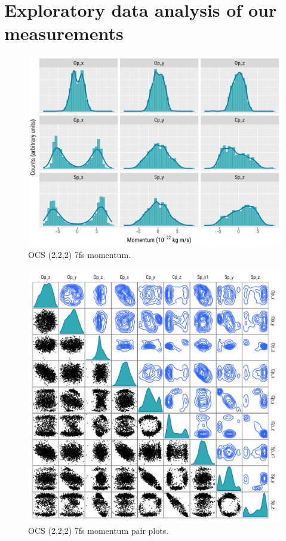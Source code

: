 
\pagebreak
\section{Exploratory data analysis of our measurements}

\begin{figure}
  \centering
  \includegraphics[width=\textwidth]{Plots/OCS2227fsMomentum}
  \caption[OCS (2,2,2) 7fs momentum.]
  {OCS (2,2,2) 7fs momentum.}
  \label{fig:OCS2227fsMomentum}
\end{figure}
\clearpage

\pagebreak
\begin{figure}
  \centering
  \includegraphics[width=\textwidth]{Plots/OCS2227fsMomentumPairPlots}
  \caption[OCS (2,2,2) 7fs momentum pair plots.]
  {OCS (2,2,2) 7fs momentum pair plots.}
  \label{fig:OCS2227fsMomentumPairPlots}
\end{figure}
\clearpage

